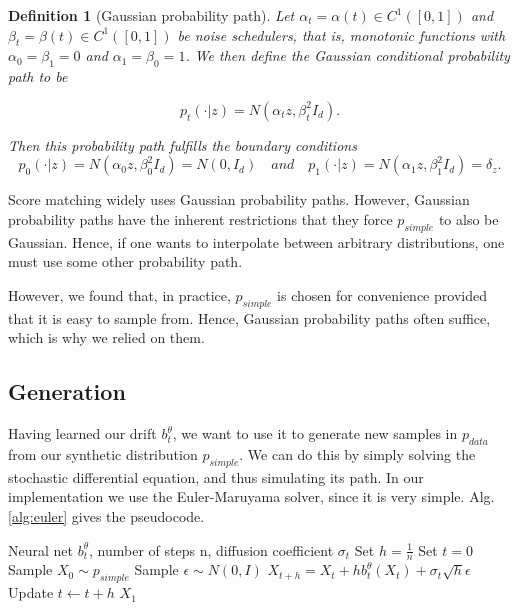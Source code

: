 \documentclass[12pt]{article}
\theoremstyle{break}
\newtheorem{definition}{Definition}[section]
\begin{document}
\begin{definition}[Gaussian probability path]
	Let $\alpha_t = \alpha(t) \in C^1([0,1])$ and $\beta_t = \beta(t) \in C^1([0,1])$ be noise schedulers, that is, monotonic functions with $\alpha_0 = \beta_1 = 0$ and $\alpha_1 = \beta_0 = 1$. We then define the Gaussian conditional probability path to be

	\begin{equation*}
		p_t(\cdot|z) = N(\alpha_tz, \beta_t^2 I_d).
	\end{equation*}

	Then this probability path fulfills the boundary conditions
	\begin{equation*}
		p_0(\cdot|z) = N(\alpha_0z, \beta_0^2 I_d) = N(0, I_d)\quad and \quad p_1(\cdot|z) = N(\alpha_1 z, \beta_1^2 I_d) = \delta_z.
	\end{equation*}
\end{definition}

Score matching widely uses Gaussian probability paths. However, Gaussian probability paths have the inherent restrictions that they force $p_{simple}$ to also be Gaussian. Hence, if one wants to interpolate between arbitrary distributions, one must use some other probability path.

However, we found that, in practice, $p_{simple}$ is chosen for convenience provided that it is easy to sample from. Hence, Gaussian probability paths often suffice, which is why we relied on them.

\subsection{Generation}
Having learned our drift $b_t^{\theta}$, we want to use it to generate new samples in $p_{data}$ from our synthetic distribution $p_{simple}$. We can do this by simply solving the stochastic differential equation, and thus simulating its path. In our implementation we use the Euler-Maruyama solver, since it is very simple. Alg. \ref{alg:euler} gives the pseudocode.

\begin{algorithm}[H]
	\caption{Euler-Maruyama}\label{alg:euler}
	\begin{algorithmic}
		\Require Neural net $b_t^{\theta}$, number of steps n, diffusion coefficient $\sigma_t$
		\State Set $h = \frac{1}{n}$
		\State Set $t=0$
		\State Sample $X_0 \sim p_{simple}$
		\State Sample $\epsilon \sim N(0, I)$
			\State $X_{t+h} = X_t + h b_t^{\theta} (X_t) + \sigma_t \sqrt{h} \epsilon$
			\State Update $t \leftarrow t + h$
		\EndFor
		\State \Return $X_1$
	\end{algorithmic}
\end{algorithm}
\end{document}
